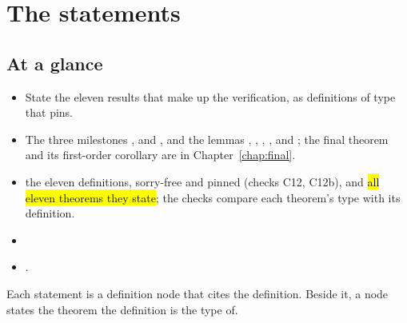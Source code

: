 \chapter{The statements}\label{chap:statements}

\section*{At a glance}
\begin{itemize}
\item {} State the eleven results that make up the verification, as definitions of type
   that  pins.
\item {} The three milestones ,  and
  , and the lemmas , , , ,
   and ; the final theorem  and its
  first-order corollary are in Chapter~\ref{chap:final}.
\item {} \stProved{} the eleven definitions, sorry-free and pinned (checks C12, C12b), and
  \hl{all eleven theorems they state}; the checks compare each theorem's type with its definition.
\item {} 
\item {} .
\end{itemize}

Each statement is a definition node that cites the  definition. Beside it, a
node states the theorem the definition is the type of.

